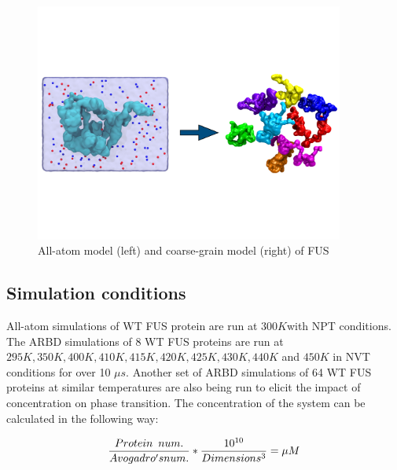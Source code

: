 \documentclass[12ptr]{article}
\begin{document}
\begin{figure}[!ht]
\begin{center}
\includegraphics[width=4.0in]{all_atom_bd.pdf}
 \caption {All-atom model (left) and coarse-grain model (right) of FUS }
 \end{center}
\end{figure}

\subsection{Simulation conditions}
All-atom simulations of WT FUS protein are run at $300K$with NPT conditions. The ARBD simulations of 8 WT FUS proteins are run at $295K, 350K, 400K, 410K, 415K, 420K, 425K, 430K, 440K$ and $450K$ in NVT conditions for over 10 $\mu s$. Another set of ARBD simulations of 64 WT FUS proteins at similar temperatures are also being run to elicit the impact of concentration on phase transition. The concentration of the system can be calculated in the following way: 

\begin{equation}
 \frac{Protein \\num.}{ Avogadro's \\ num.}  * \frac{10 ^ {10}}{Dimensions ^ {3}} = \mu M
\end{equation}
\newpage
\end{document}

